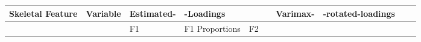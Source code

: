 \documentclass[11pt]{article}
\begin{document}
    \begin{longtable}[]{@{}llllllllll@{}}
\toprule
\begin{minipage}[b]{0.07\columnwidth}\raggedright
Skeletal Feature\strut
\end{minipage} & \begin{minipage}[b]{0.07\columnwidth}\raggedright
Variable\strut
\end{minipage} & \begin{minipage}[b]{0.07\columnwidth}\raggedright
Estimated-\strut
\end{minipage} & \begin{minipage}[b]{0.07\columnwidth}\raggedright
-Loadings\strut
\end{minipage} & \begin{minipage}[b]{0.07\columnwidth}\raggedright
\strut
\end{minipage} & \begin{minipage}[b]{0.07\columnwidth}\raggedright
\strut
\end{minipage} & \begin{minipage}[b]{0.07\columnwidth}\raggedright
Varimax-\strut
\end{minipage} & \begin{minipage}[b]{0.07\columnwidth}\raggedright
-rotated-loadings\strut
\end{minipage} & \begin{minipage}[b]{0.07\columnwidth}\raggedright
\strut
\end{minipage} & \begin{minipage}[b]{0.07\columnwidth}\raggedright
\strut
\end{minipage}\tabularnewline
\midrule
\endhead
\begin{minipage}[t]{0.07\columnwidth}\raggedright
\strut
\end{minipage} & \begin{minipage}[t]{0.07\columnwidth}\raggedright
\strut
\end{minipage} & \begin{minipage}[t]{0.07\columnwidth}\raggedright
F1\strut
\end{minipage} & \begin{minipage}[t]{0.07\columnwidth}\raggedright
F1 Proportions\strut
\end{minipage} & \begin{minipage}[t]{0.07\columnwidth}\raggedright
F2\strut
\end{minipage} & \begin{minipage}[t]{0.07\columnwidth}\raggedright

\end{minipage}
\end{longtable}
\end{document}
